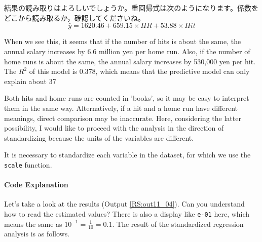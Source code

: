 \documentclass{ltjbook}
\begin{document}
結果の読み取りはよろしいでしょうか。重回帰式は次のようになります。係数をどこから読み取るか，確認してくださいね。
\[ \hat{y} = 1620.46 + 659.15 \times HR + 53.88 \times Hit \]

When we see this, it seems that if the number of hits is about the same, the annual salary increases by 6.6 million yen per home run. Also, if the number of home runs is about the same, the annual salary increases by 530,000 yen per hit.
The $R^2$ of this model is $0.378$, which means that the predictive model can only explain about 37%

Both hits and home runs are counted in 'books', so it may be easy to interpret them in the same way. Alternatively, if a hit and a home run have different meanings, direct comparison may be inaccurate.
Here, considering the latter possibility, I would like to proceed with the analysis in the direction of standardizing because the units of the variables are different.

It is necessary to standardize each variable in the dataset, for which we use the \texttt{scale} function.




\paragraph{Code Explanation}




Let's take a look at the results (Output \ref{RS:out11_04}). Can you understand how to read the estimated values? There is also a display like \verb|e-01| here, which means the same as $10^{-1}=\frac{1}{10}=0.1$. The result of the standardized regression analysis is as follows.
\end{document}

